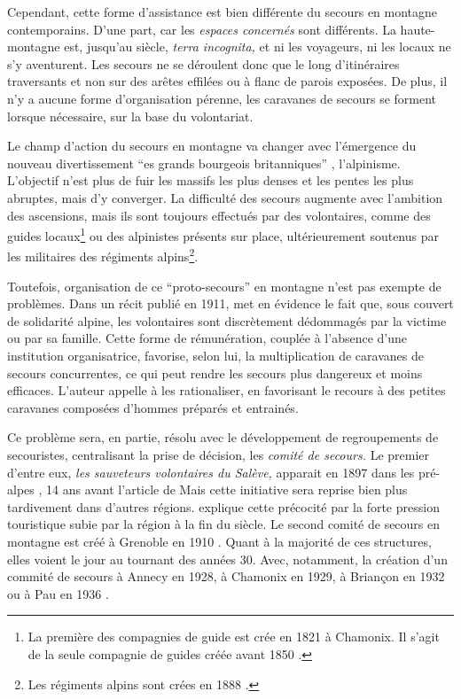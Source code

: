 Cependant, cette forme d'assistance est bien différente du secours en
montagne contemporains. D'une part, car les \emph{espaces concernés}
sont différents. La haute-montagne est, jusqu'au 
siècle, \emph{terra incognita,} et ni les voyageurs, ni les locaux ne
s'y aventurent. Les secours ne se déroulent donc que le long
d'itinéraires traversants et non sur des arêtes effilées ou à flanc de
parois exposées. De plus, il n'y a aucune forme d'organisation
pérenne, les caravanes de secours se forment lorsque nécessaire, sur
la base du volontariat.

Le champ d'action du secours en montagne va changer avec l’émergence
du nouveau divertissement \enquote{es grands bourgeois
  britanniques} \autocite{Descamps2018}, l'alpinisme. L'objectif n'est
plus de fuir les massifs les plus denses et les pentes les plus
abruptes, mais d'y converger.  La difficulté des secours augmente avec
l'ambition des ascensions, mais ils sont toujours effectués par des
volontaires, comme des guides locaux\footnote{La première des
  compagnies de guide est crée en 1821 à Chamonix. Il s'agit de la
  seule compagnie de guides créée avant 1850
  \autocite{ContributeursWikipedia2020b}.} ou des alpinistes présents
sur place, ultérieurement soutenus par les militaires des régiments
alpins\footnote{Les régiments alpins sont crées en 1888
  \autocite{Mezin2016}.}.

Toutefois, organisation de ce \enquote{proto-secours} en montagne
n'est pas exempte de problèmes. Dans un récit publié en 1911,
\textcite{Thomas1911} met en évidence le fait que, sous couvert de
solidarité alpine, les volontaires sont discrètement dédommagés par la
victime ou par sa famille. Cette forme de rémunération, couplée à
l'absence d'une institution organisatrice, favorise, selon lui, la
multiplication de caravanes de secours concurrentes, ce qui peut
rendre les secours plus dangereux et moins efficaces. L'auteur appelle
à les rationaliser, en favorisant le recours à des petites caravanes
composées d'hommes préparés et entrainés.

Ce problème sera, en partie, résolu avec le développement de
regroupements de secouristes, centralisant la prise de décision, les
\emph{comité de secours.} Le premier d'entre eux, \emph{les sauveteurs
  volontaires du Salève,} apparait en 1897 dans les pré-alpes
\autocite{CFDLD}, 14 ans avant l'article de  Mais cette
initiative sera reprise bien plus tardivement dans d'autres
régions. \textcite{Caille2016} explique cette précocité par la forte
pression touristique subie par la région à la fin du 
siècle.  Le second comité de secours en montagne est créé à Grenoble
en 1910 \autocite{CFDLD,Caille2016}. Quant à la majorité de ces
structures, elles voient le jour au tournant des années 30. Avec,
notamment, la création d'un commité de secours à Annecy en 1928, à
Chamonix en 1929, à Briançon en 1932 ou à Pau en 1936 \autocite{CFDLD,
  Devies1946}.

